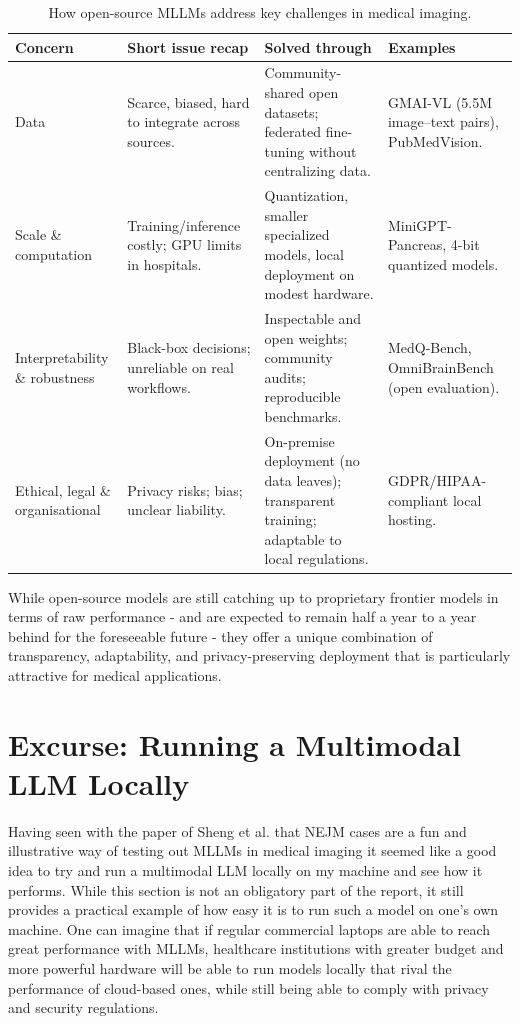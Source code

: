 \documentclass{imc-inf}
\begin{document}
\begin{table}[ht!]
\centering
\small
\caption{How open-source MLLMs address key challenges in medical imaging.}
\label{tab:opensource-vs-issues}
\begin{tabular}{p{3cm} p{3.5cm} p{3.5cm} p{3.5cm}}
\hline
\textbf{Concern} & \textbf{Short issue recap} & \textbf{Solved through} & \textbf{Examples} \\
\hline
Data
& Scarce, biased, hard to integrate across sources.
& Community-shared open datasets; federated fine-tuning without centralizing data.
& GMAI-VL (5.5M image--text pairs), PubMedVision. \\
\hline
Scale \& computation
& Training/inference costly; GPU limits in hospitals.
& Quantization, smaller specialized models, local deployment on modest hardware.
& MiniGPT-Pancreas, 4-bit quantized models. \\
\hline
Interpretability \& robustness
& Black-box decisions; unreliable on real workflows.\cite{li2026gmai}
& Inspectable and open weights; community audits; reproducible benchmarks.
& MedQ-Bench, OmniBrainBench (open evaluation). \\
\hline
Ethical, legal \& organisational
& Privacy risks; bias; unclear liability.
& On-premise deployment (no data leaves); transparent training; adaptable to local regulations.
& GDPR/HIPAA-compliant local hosting. \\
\hline
\end{tabular}
\end{table}

While open-source models are still catching up to proprietary frontier models in terms of raw performance - and are expected to remain half a year to a year behind for the foreseeable future - they offer a unique combination of transparency, adaptability, and privacy-preserving deployment that is particularly attractive for medical applications.

\section{Excurse: Running a Multimodal LLM Locally}

Having seen with the paper of Sheng et al. that NEJM cases are a fun and illustrative way of testing out MLLMs in medical imaging\cite{sheng2026multimodal} it seemed like a good idea to try and run a multimodal LLM locally on my machine and see how it performs.
While this section is not an obligatory part of the report, it still provides a practical example of how easy it is to run such a model on one's own machine.
One can imagine that if regular commercial laptops are able to reach great performance with MLLMs, healthcare institutions with greater budget and more powerful hardware will be able to run models locally that rival the performance of cloud-based ones, while still being able to comply with privacy and security regulations.
\end{document}
